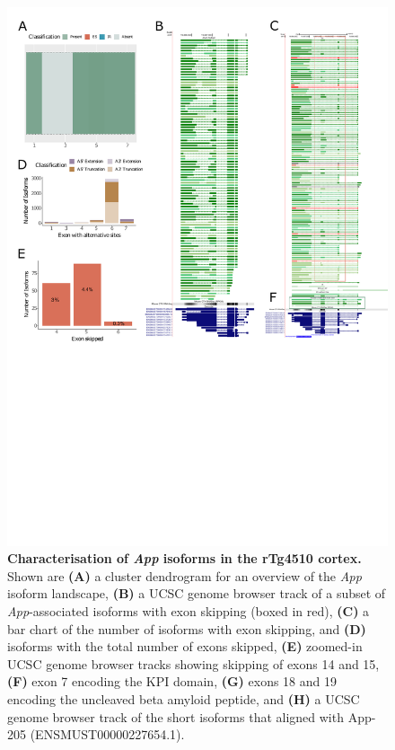 \begin{figure}[htp]
	\centering
	\includegraphics[page=2,trim={0 2.2cm 0 0},scale = 0.85]{Figures/TargetGenes_Annotation_Portrait.pdf}
	\captionsetup{width=0.95\textwidth}
	\caption[Characterisation of the \textit{App} isoform landscape]%
	{\textbf{Characterisation of \textit{App} isoforms in the rTg4510 cortex.} Shown are \textbf{(A)} a cluster dendrogram for an overview of the \textit{App} isoform landscape, \textbf{(B)} a UCSC genome browser track of a subset of \textit{App}-associated isoforms with exon skipping (boxed in red), \textbf{(C)} a bar chart of the number of isoforms with exon skipping, and \textbf{(D)} isoforms with the total number of exons skipped, \textbf{(E)} zoomed-in UCSC genome browser tracks showing skipping of exons 14 and 15, \textbf{(F)} exon 7 encoding the KPI domain, \textbf{(G)} exons 18 and 19 encoding the uncleaved beta amyloid peptide, and \textbf{(H)} a UCSC genome browser track of the short isoforms that aligned with App-205 (ENSMUST00000227654.1).}    
	\label{fig:app}
\end{figure}
\restoregeometry

